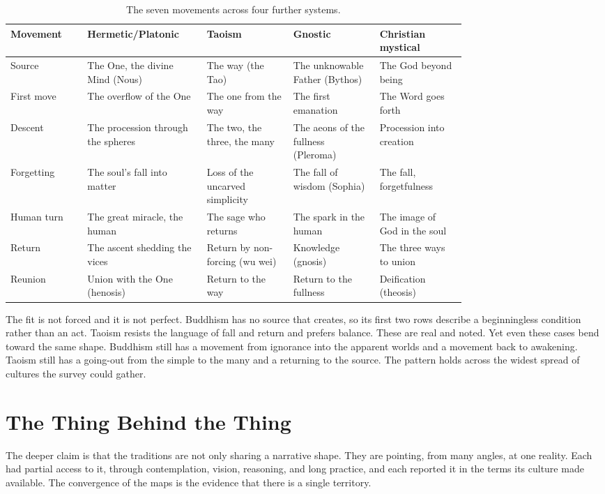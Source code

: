 {\small
\begin{longtable}{L{0.135\linewidth} L{0.155\linewidth} L{0.155\linewidth} L{0.155\linewidth} L{0.155\linewidth}}
\caption{The seven movements across four further systems.}\\
\toprule
\textbf{Movement} & \textbf{Hermetic/Platonic} & \textbf{Taoism} & \textbf{Gnostic} & \textbf{Christian mystical} \\
\midrule
Source & The One, the divine Mind (Nous) & The way (the Tao) & The unknowable Father (Bythos) & The God beyond being \\
First move & The overflow of the One & The one from the way & The first emanation & The Word goes forth \\
Descent & The procession through the spheres & The two, the three, the many & The aeons of the fullness (Pleroma) & Procession into creation \\
Forgetting & The soul's fall into matter & Loss of the uncarved simplicity & The fall of wisdom (Sophia) & The fall, forgetfulness \\
Human turn & The great miracle, the human & The sage who returns & The spark in the human & The image of God in the soul \\
Return & The ascent shedding the vices & Return by non-forcing (wu wei) & Knowledge (gnosis) & The three ways to union \\
Reunion & Union with the One (henosis) & Return to the way & Return to the fullness & Deification (theosis) \\
\bottomrule
\end{longtable}
}

The fit is not forced and it is not perfect. Buddhism has no source that creates, so its first two rows
describe a beginningless condition rather than an act. Taoism resists the language of fall and return and
prefers balance. These are real and noted. Yet even these cases bend toward the same shape. Buddhism still
has a movement from ignorance into the apparent worlds and a movement back to awakening. Taoism still has a
going-out from the simple to the many and a returning to the source. The pattern holds across the widest
spread of cultures the survey could gather.

\section{The Thing Behind the Thing}

The deeper claim is that the traditions are not only sharing a narrative shape. They are pointing, from many
angles, at one reality. Each had partial access to it, through contemplation, vision, reasoning, and long
practice, and each reported it in the terms its culture made available. The convergence of the maps is the
evidence that there is a single territory.

